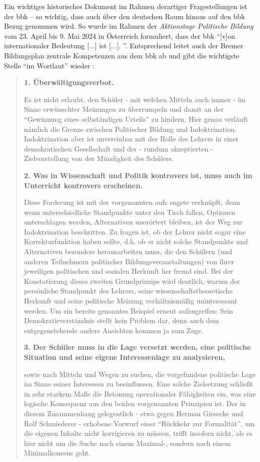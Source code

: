 Ein wichtiges historisches Dokument im Rahmen derartiger Fragestellungen ist der \Acrlong{bbk} \autocites[29]{Gesner2016}{Wehling1977} -- so wichtig, dass auch über den deutschen Raum hinaus auf den \gls{bbk} Bezug genommen wird. So wurde im Rahmen der \emph{Aktionstage Politische Bildung} vom 23. April bis 9. Mai 2024 in Österreich formuliert, dass der \gls{bbk} \enquote{[v]on internationaler Bedeutung [...] ist [...]. \autocite{bbkÖsterreich2023}}. Entsprechend leitet auch der Bremer Bildungsplan zentrale Kompetenzen aus dem \gls{bbk} ab und gibt die wichtigste Stelle \enquote{im Wortlaut} wieder \autocite[11-12]{bplan}: 
\begin{quote}
    \textbf{1. Überwältigungsverbot.}

    Es ist nicht erlaubt, den Schüler - mit welchen Mitteln auch immer - im Sinne erwünschter Meinungen zu überrumpeln und damit an der \enquote{Gewinnung eines selbständigen Urteils} zu hindern. Hier genau verläuft nämlich die Grenze zwischen Politischer Bildung und Indoktrination. Indoktrination aber ist unvereinbar mit der Rolle des Lehrers in einer demokratischen Gesellschaft und der - rundum akzeptierten - Zielvorstellung von der Mündigkeit des Schülers. 

    \textbf{2. Was in Wissenschaft und Politik kontrovers ist, muss auch im Unterricht kontrovers erscheinen.}

    Diese Forderung ist mit der vorgenannten aufs engste verknüpft, denn wenn unterschiedliche Standpunkte unter den Tisch fallen, Optionen unterschlagen werden, Alternativen unerörtert bleiben, ist der Weg zur Indoktrination beschritten. Zu fragen ist, ob der Lehrer nicht sogar eine Korrekturfunktion haben sollte, d.h. ob er nicht solche Standpunkte und Alternativen besonders herausarbeiten muss, die den Schülern (und anderen Teilnehmern politischer Bildungsveranstaltungen) von ihrer jeweiligen politischen und sozialen Herkunft her fremd sind. Bei der Konstatierung dieses zweiten Grundprinzips wird deutlich, warum der persönliche Standpunkt des Lehrers, seine wissenschaftstheoretische Herkunft und seine politische Meinung verhältnismäßig uninteressant werden. Um ein bereits genanntes Beispiel erneut aufzugreifen: Sein Demokratieverständnis stellt kein Problem dar, denn auch dem entgegenstehende andere Ansichten kommen ja zum Zuge. 
    
    \textbf{3. Der Schüler muss in die Lage versetzt werden, eine politische Situation und seine eigene Interessenlage zu analysieren,} 

    sowie nach Mitteln und Wegen zu suchen, die vorgefundene politische Lage im Sinne seiner Interessen zu beeinflussen. Eine solche Zielsetzung schließt in sehr starkem Maße die Betonung operationaler Fähigkeiten ein, was eine logische Konsequenz aus den beiden vorgenannten Prinzipien ist. Der in diesem Zusammenhang gelegentlich - etwa gegen Herman Giesecke und Rolf Schmiederer - erhobene Vorwurf einer \enquote{Rückkehr zur Formalität}, um die eigenen Inhalte nicht korrigieren zu müssen, trifft insofern nicht, als es hier nicht um die Suche nach einem Maximal-, sondern nach einem Minimalkonsens geht. 
    

\end{quote}
